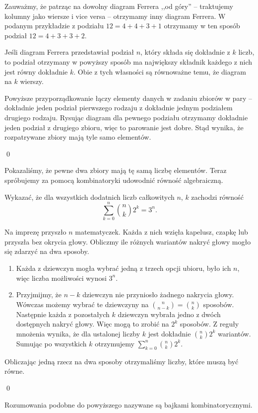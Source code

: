 \vspace{10px}
\noindent
Zauważmy, że patrząc na dowolny diagram Ferrera ,,od góry'' -- traktujemy kolumny jako wiersze i vice versa -- otrzymamy inny diagram Ferrera. W podanym przykładzie z podziału $12 = 4 + 4 + 3 + 1$ otrzymamy w ten sposób podział $12 = 4 + 3 + 3 + 2$.

\vspace{10px}
\noindent
Jeśli diagram Ferrera przedstawiał podział $n$, który składa się dokładnie z $k$ liczb, to podział otrzymany w powyższy sposób ma największy składnik każdego z nich jest równy dokładnie $k$. Obie z tych własności są równoważne temu, że diagram na $k$ wierszy.

\vspace{10px}
\noindent
Powyższe przyporządkowanie łączy elementy danych w zadaniu zbiorów w pary -- dokładnie jeden podział pierwszego rodzaju z dokładnie jednym podziałem drugiego rodzaju. Rysując diagram dla pewnego podziału otrzymamy dokładnie jeden podział z drugiego zbioru, więc to parowanie jest dobre. Stąd wynika, że rozpatrywane zbiory mają tyle samo elementów.

\qed

\vspace{10px}

\noindent
Pokazaliśmy, że pewne dwa zbiory mają tę samą liczbę elementów. Teraz spróbujemy za pomocą kombinatoryki udowodnić równość algebraiczną.

\vspace{5px}



\noindent
Wykazać, że dla wszystkich dodatnich liczb całkowitych $n$, $k$ zachodzi równość
\[
    \sum^{n}_{k=0} {{n}\choose{k}} 2^k = 3^n.
\]

\vspace{5px}


\vspace{5px}

\noindent
Na imprezę przyszło $n$ matematyczek. Każda z nich wzięła kapelusz, czapkę lub przyszła bez okrycia głowy. Obliczmy ile różnych wariantów nakryć głowy mogło się zdarzyć na dwa sposoby.
\begin{enumerate}
    \item Każda z dziewczyn mogła wybrać jedną z trzech opcji ubioru, było ich $n$, więc liczba możliwości wynosi $3^n$.
    \item Przyjmijmy, że $n - k$ dziewczyn nie przyniosło żadnego nakrycia głowy. 
    Wówczas możemy wybrać te dziewczyny na ${{n}\choose{n - k}} = {{n}\choose{k}}$ sposobów. 
    Następnie każda z pozostałych $k$ dziewczyn wybrała jedno z dwóch dostępnych nakryć głowy. 
    Więc mogą to zrobić na $2^k$ sposobów. Z reguły mnożenia wynika, że dla ustalonej liczby $k$ jest dokładnie ${{n}\choose{k}} 2^k$ wariantów. Sumując po wszystkich $k$ otrzymujemy $\sum^{n}_{k=0} {{n}\choose{k}} 2^k$.
\end{enumerate}

\noindent
Obliczając jedną rzecz na dwa sposoby otrzymaliśmy liczby, które muszą być równe.

\qed

\vspace{10px}

\noindent
Rozumowania podobne do powyższego nazywane są bajkami kombinatorycznymi.

\vspace{10px}